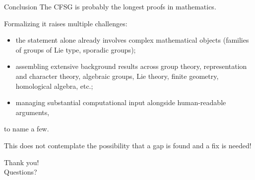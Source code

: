 \documentclass{beamer}
\begin{document}
\begin{frame}{Conclusion}
The CFSG is probably the longest proofs in mathematics.

\bigskip

Formalizing it raises multiple challenges:
\begin{itemize}
  \item the statement alone already involves complex mathematical objects (families of groups of Lie type, sporadic groups);
  \item assembling extensive background results across group theory, representation and character theory, algebraic groups, Lie theory, finite geometry, homological algebra, etc.;
  \item managing substantial computational input alongside human-readable arguments,
\end{itemize}
to name a few.

\bigskip

This does not contemplate the possibility that a gap is found and a fix is needed!
\end{frame}

\begin{frame}
\begin{center}
  {\huge Thank you!}\\[30pt]
  {\huge Questions?}
\end{center}

\end{frame}

\end{document}
